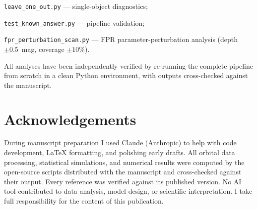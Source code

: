 \documentclass[usenatbib]{mnras}
\begin{document}
\noindent\texttt{leave\_one\_out.py} --- single-object diagnostics;

\noindent\texttt{test\_known\_answer.py} --- pipeline validation;

\noindent\texttt{fpr\_perturbation\_scan.py} --- FPR parameter-perturbation analysis (depth $\pm0.5$~mag, coverage $\pm10\%$).

\smallskip
\noindent All analyses have been independently verified by re-running the complete pipeline from scratch in a clean Python environment, with outputs cross-checked against the manuscript.

\section*{Acknowledgements}

During manuscript preparation I used Claude (Anthropic) to help with code
development, LaTeX formatting, and polishing early drafts. All orbital
data processing, statistical simulations, and numerical results were
computed by the open-source scripts distributed with the manuscript and
cross-checked against their output. Every reference was verified against
its published version. No AI tool contributed to data analysis, model
design, or scientific interpretation. I take full responsibility for the
content of this publication.



\end{document}
